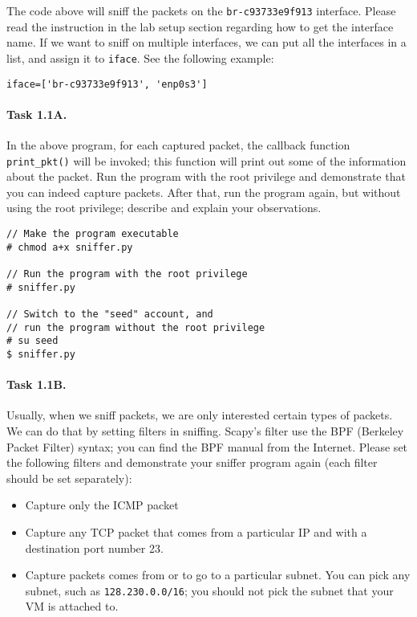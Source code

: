 The code above will sniff the packets on the \texttt{br-c93733e9f913}
interface. Please read the instruction in the lab setup section
regarding how to get the interface name. 
If we want to sniff on multiple interfaces, we can
put all the interfaces in a list, and assign it to \texttt{iface}.
See the following example: 


\begin{lstlisting}
iface=['br-c93733e9f913', 'enp0s3']
\end{lstlisting}
 


\paragraph{Task 1.1A.} In the above program, for each captured
packet, the callback function \texttt{print\_pkt()} will be invoked; this function will print out some of
the information about the packet. Run the program with the root privilege and demonstrate that
you can indeed capture packets. After that, run the program again, but without using the root
privilege; describe and explain your observations. 
 
\begin{lstlisting}
// Make the program executable 
# chmod a+x sniffer.py

// Run the program with the root privilege
# sniffer.py

// Switch to the "seed" account, and
// run the program without the root privilege
# su seed
$ sniffer.py
\end{lstlisting}


\paragraph{Task 1.1B.} Usually, when we sniff packets, we are only
interested certain types of packets. We can do that by setting 
filters in sniffing. Scapy's filter use the 
BPF (Berkeley Packet Filter) syntax; you can find the BPF manual 
from the Internet. Please set the following filters and demonstrate 
your sniffer program again (each filter should be set separately):

\begin{itemize} 
 \item Capture only the ICMP packet
 \item Capture any TCP packet that comes from a particular IP and with 
 a destination port number 23. 
 \item Capture packets comes from or to go to a particular subnet. You can
 pick any subnet, such as \texttt{128.230.0.0/16}; you should not 
 pick the subnet that your VM is attached to. 
\end{itemize} 



